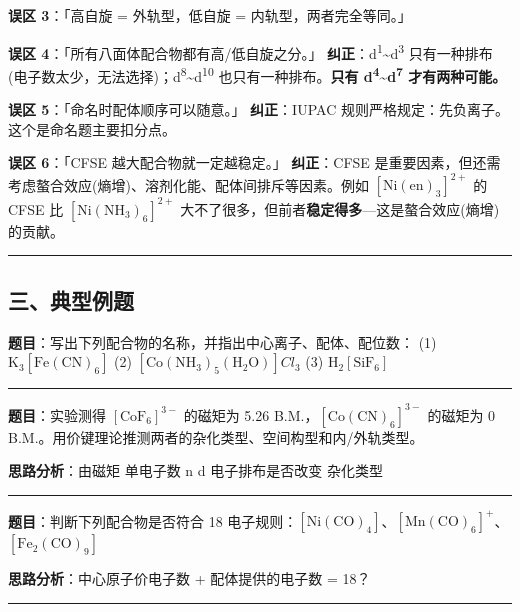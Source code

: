 \textbf{误区 3}：「高自旋 = 外轨型，低自旋 = 内轨型，两者完全等同。」

\textbf{误区 4}：「所有八面体配合物都有高/低自旋之分。」
\textbf{纠正}：d\textsuperscript{1}\textasciitilde d\textsuperscript{3} 只有一种排布(电子数太少，无法选择)；d\textsuperscript{8}\textasciitilde d\textsuperscript{10} 也只有一种排布。\textbf{只有 d\textsuperscript{4}\textasciitilde d\textsuperscript{7} 才有两种可能。}

\textbf{误区 5}：「命名时配体顺序可以随意。」
\textbf{纠正}：IUPAC 规则严格规定：先负离子。这个是命名题主要扣分点。

\textbf{误区 6}：「CFSE 越大配合物就一定越稳定。」
\textbf{纠正}：CFSE 是重要因素，但还需考虑螯合效应(熵增)、溶剂化能、配体间排斥等因素。例如 \([\mathrm{Ni(en)_3}]^{2+}\) 的 CFSE 比 \([\mathrm{Ni(NH_3)_6}]^{2+}\) 大不了很多，但前者\textbf{稳定得多}---这是螯合效应(熵增)的贡献。

\begin{center}\rule{0.5\linewidth}{0.5pt}\end{center}

\subsection{三、典型例题}\label{ux4e09ux5178ux578bux4f8bux9898}

\textbf{题目}：写出下列配合物的名称，并指出中心离子、配体、配位数：
(1) \(\mathrm{K_3[Fe(CN)_6]}\) (2) \([\mathrm{Co(NH_3)_5(H_2O)}]Cl_3\) (3) \(\mathrm{H_2[SiF_6]}\)

\begin{center}\rule{0.5\linewidth}{0.5pt}\end{center}

\textbf{题目}：实验测得 \([\mathrm{CoF_6}]^{3-}\) 的磁矩为 5.26 B.M.，\([\mathrm{Co(CN)_6}]^{3-}\) 的磁矩为 0 B.M.。用价键理论推测两者的杂化类型、空间构型和内/外轨类型。

\textbf{思路分析}：由磁矩 \箭 单电子数 n \箭 d 电子排布是否改变 \箭 杂化类型

\begin{center}\rule{0.5\linewidth}{0.5pt}\end{center}

\textbf{题目}：判断下列配合物是否符合 18 电子规则：\(\mathrm{[Ni(CO)_4]}\)、\(\mathrm{[Mn(CO)_6]^+}\)、\(\mathrm{[Fe_2(CO)_9]}\)

\textbf{思路分析}：中心原子价电子数 + 配体提供的电子数 = 18？

\begin{center}\rule{0.5\linewidth}{0.5pt}\end{center}

